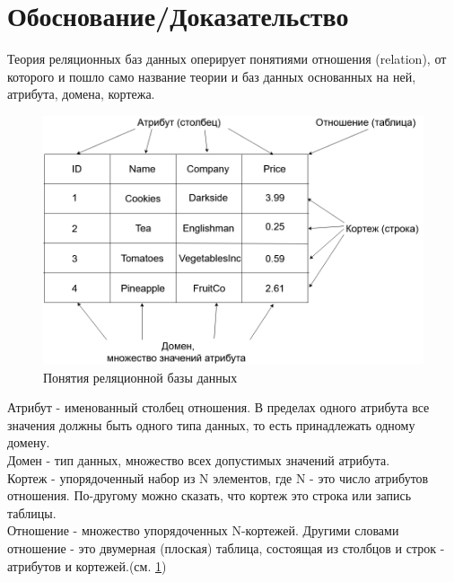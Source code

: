 \section*{Обоснование/Доказательство}
\indent Теория реляционных баз данных оперирует понятиями отношения (relation), от которого и пошло само название теории и баз данных основанных на ней, атрибута, домена, кортежа.

\begin{figure}[ht]
	\centering
	\includegraphics[width=\linewidth]{pics/databaseExample.png}
	\caption{Понятия реляционной базы данных}
	\label{fig:dbExample}
\end{figure}

\indent Атрибут - именованный столбец отношения.
В пределах одного атрибута все значения должны быть одного типа данных, то есть принадлежать одному домену.\\
\indent Домен - тип данных, множество всех допустимых значений атрибута.\\
\indent Кортеж - упорядоченный набор из N элементов, где N - это число атрибутов отношения.
По-другому можно сказать, что кортеж это строка или запись таблицы.\\
\indent Отношение - множество упорядоченных N-кортежей.
Другими словами отношение - это двумерная (плоская) таблица, состоящая из столбцов и строк - атрибутов и кортежей.(см. \ref{fig:dbExample})\\

